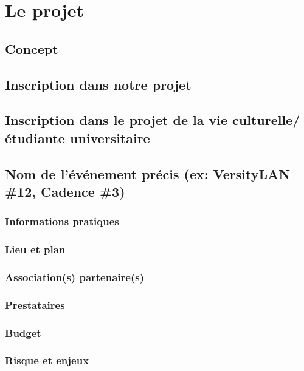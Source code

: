 \chapter{Le projet}
\label{sec:monstage}

\section{Concept}
    
\section{Inscription dans notre projet}

\section{Inscription dans le projet de la vie culturelle/étudiante universitaire}

\section{Nom de l'événement précis (ex: VersityLAN \#12, Cadence \#3)}
    
    \subsection{Informations pratiques}
    
    \subsection{Lieu et plan}
    
    \subsection{Association(s) partenaire(s)}
    
    \subsection{Prestataires}
    
    \subsection{Budget}
    
    \subsection{Risque et enjeux}
    
    
       
    
        



